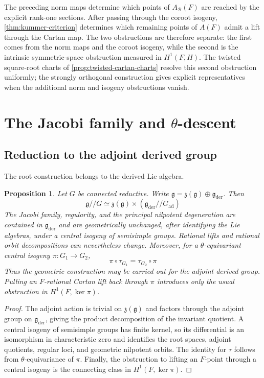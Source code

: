 \documentclass[11pt]{amsart}
\newtheorem{proposition}[proposition]{Proposition}
\theoremstyle{definition}
\theoremstyle{remark}
\newcommand{\cB}{\mathcal B}
\newcommand{\g}{\mathfrak g}
\begin{document}
The preceding norm maps determine which points of $A_\cB(F)$ are reached by
the explicit rank-one sections.  After passing through the coroot isogeny,
\cref{thm:kummer-criterion} determines which remaining points of $A(F)$ admit
a lift through the Cartan map.  The two obstructions are therefore
separate: the first comes from the norm maps and the coroot isogeny, while
the second is the intrinsic symmetric-space obstruction measured in
$H^1(F,H)$.  The twisted square-root charts of
\cref{prop:twisted-cartan-charts} resolve this second obstruction uniformly;
the strongly orthogonal construction gives explicit representatives when the
additional norm and isogeny obstructions vanish.

\section{\texorpdfstring{The Jacobi family and $\theta$-descent}{The Jacobi family and theta-descent}}

\subsection{Reduction to the adjoint derived group}
The root construction belongs to the derived Lie algebra.

\begin{proposition}\label{prop:adjoint-reduction}
Let $G$ be connected reductive.  Write
$\g=\mathfrak z(\g)\oplus\g_{\mathrm{der}}$.  Then
\[
 \g/\!/G\simeq
 \mathfrak z(\g)\times
 (\g_{\mathrm{der}}/\!/G_{\mathrm{ad}})
\]
The Jacobi family, regularity, and the principal nilpotent degeneration are
contained in $\g_{\mathrm{der}}$ and are geometrically unchanged, after
identifying the Lie algebras, under a central isogeny of semisimple groups.
Rational lifts and rational orbit decompositions can nevertheless change.
Moreover, for a $\theta$-equivariant central isogeny
$\pi:G_1\to G_2$,
\[
 \pi\circ\tau_{G_1}=\tau_{G_2}\circ\pi
\]
Thus the geometric construction may be carried out for the adjoint derived
group.  Pulling an $F$-rational Cartan lift back through $\pi$ introduces
only the usual obstruction in $H^1(F,\ker\pi)$.
\end{proposition}

\begin{proof}
The adjoint action is trivial on $\mathfrak z(\g)$ and factors through the
adjoint group on $\g_{\mathrm{der}}$, giving the product decomposition of
the invariant quotient.  A central isogeny of semisimple groups has finite
kernel, so its differential is an isomorphism in characteristic zero and
identifies the root spaces, adjoint quotients, regular loci, and geometric
nilpotent orbits.  The identity for $\tau$ follows from $\theta$-equivariance of
$\pi$.  Finally, the obstruction to lifting an $F$-point through a central
isogeny is the connecting class in $H^1(F,\ker\pi)$.
\end{proof}
\end{document}
